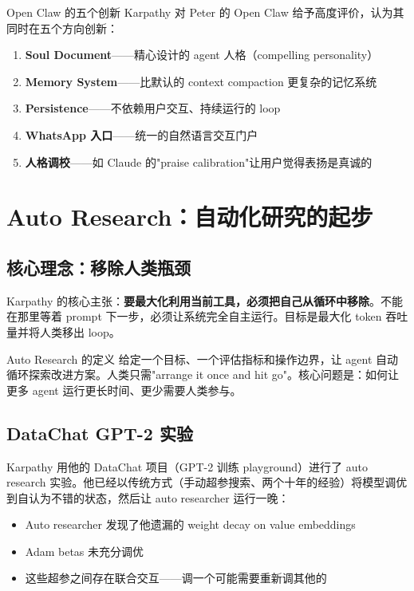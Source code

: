 \documentclass[a4paper]{article}
\begin{document}
\begin{knowledgebox}{Open Claw 的五个创新}
Karpathy 对 Peter 的 Open Claw 给予高度评价，认为其同时在五个方向创新：
\begin{enumerate}
    \item \textbf{Soul Document}——精心设计的 agent 人格（compelling personality）
    \item \textbf{Memory System}——比默认的 context compaction 更复杂的记忆系统
    \item \textbf{Persistence}——不依赖用户交互、持续运行的 loop
    \item \textbf{WhatsApp 入口}——统一的自然语言交互门户
    \item \textbf{人格调校}——如 Claude 的"praise calibration"让用户觉得表扬是真诚的
\end{enumerate}
\end{knowledgebox}


\section{Auto Research：自动化研究的起步}

\subsection{核心理念：移除人类瓶颈}

Karpathy 的核心主张：\textbf{要最大化利用当前工具，必须把自己从循环中移除}。不能在那里等着 prompt 下一步，必须让系统完全自主运行。目标是最大化 token 吞吐量并将人类移出 loop。

\begin{importantbox}{Auto Research 的定义}
给定一个目标、一个评估指标和操作边界，让 agent 自动循环探索改进方案。人类只需"arrange it once and hit go"。核心问题是：如何让更多 agent 运行更长时间、更少需要人类参与。
\end{importantbox}

\subsection{DataChat GPT-2 实验}

Karpathy 用他的 DataChat 项目（GPT-2 训练 playground）进行了 auto research 实验。他已经以传统方式（手动超参搜索、两个十年的经验）将模型调优到自认为不错的状态，然后让 auto researcher 运行一晚：

\begin{itemize}
    \item Auto researcher 发现了他遗漏的 weight decay on value embeddings
    \item Adam betas 未充分调优
    \item 这些超参之间存在联合交互——调一个可能需要重新调其他的
\end{itemize}
\end{document}
